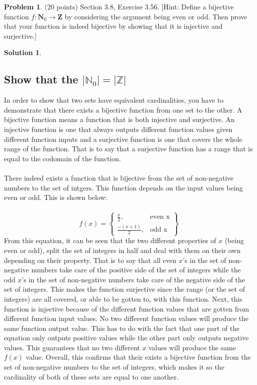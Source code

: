 \documentclass{article}
\theoremstyle{definition}
\newtheorem{problem}{Problem}
\newtheorem*{solution}{Solution}
\newcommand{\N}{\mathbf{N}}
\newcommand{\Z}{\mathbf{Z}}
\begin{document}
\newpage
\begin{problem} (20 points) Section 3.8, Exercise 3.56.
[Hint: Define a bijective function $f\colon \N_0\rightarrow \Z$ by
considering the argument being even or odd. Then prove that your 
function is indeed bijective by showing that it is injective and surjective.]
\end{problem}
\begin{solution}
\hspace{1cm}
\subsection*{Show that the $|\mathbb{N}_0| = |\mathbb{Z}|$}
In order to show that two sets have equivalent cardinalities, you have to demonstrate that there exists a bijective function from one set to the other. A bijective function means a function that is both injective and surjective. An injective function is one that always outputs different function values given different function inputs and a surjective function is one that covers the whole range of the function. That is to say that a surjective function has a range that is equal to the codomain of the function.\\\\
There indeed exists a function that is bijective from the set of non-negative numbers to the set of intgers. This function depends on the input values being even or odd. This is shown below:\\\\
\begin{equation}
f(x) =
\left\{
	\begin{array}{lr}
		\frac{x}{2}, & \text{even x}\\
		\frac{-(x+1)}{2}, & \text{odd x}
	\end{array}
\right\}
\end{equation}
From this equation, it can be seen that the two different properties of $x$ (being even or odd), split the set of integers in half and deal with them on their own depending on their property. That is to say that all even $x$'s in the set of non-negative numbers take care of the positive side of the set of integers while the odd $x$'s in the set of non-negative numbers take care of the negative side of the set of integers. This makes the function surjective since the range (or the set of integers) are all covered, or able to be gotten to, with this function. Next, this function is injective because of the different function values that are gotten from different function input values. No two different function values will produce the same function output value. This has to do with the fact that one part of the equation only outputs positive values while the other part only outputs negative values. This guarantees that no two different $x$ values will produce the same $f(x)$ value. Overall, this confirms that their exists a bijective function from the set of non-negative numbers to the set of integers, which makes it so the cardinality of both of these sets are equal to one another.
\end{solution}
\end{document}
